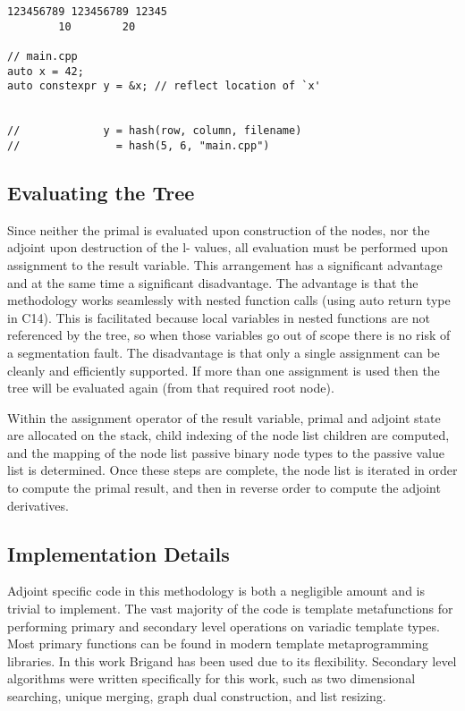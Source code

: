 \documentclass[a4paper,10pt]{article}
\def\CC{{C\nolinebreak[4]\hspace{-.05em}\raisebox{.4ex}{\tiny\bf ++}}}
\begin{document}
\begin{lstlisting}[caption={Define the compile-time address-of operator to return an effectively unique value}, label=lst:reflect]
123456789 123456789 12345
        10        20

// main.cpp
auto x = 42;
auto constexpr y = &x; // reflect location of `x'


//             y = hash(row, column, filename)
//               = hash(5, 6, "main.cpp")
\end{lstlisting}


\subsection{Evaluating the Tree}
Since neither the primal is evaluated upon construction of the nodes, nor the adjoint upon destruction of the l-
values, all evaluation must be performed upon assignment to the result variable. This arrangement has a significant
advantage and at the same time a significant disadvantage. The advantage is that the methodology works seamlessly
with nested function calls (using auto return type in {\CC}14). This is facilitated because local variables in nested
functions are not referenced by the tree, so when those variables go out of scope there is no risk of a segmentation
fault. The disadvantage is that only a single assignment can be cleanly and efficiently supported. If more than one
assignment is used then the tree will be evaluated again (from that required root node).

Within the assignment operator of the result variable, primal and adjoint state are allocated on the stack, child
indexing of the node list children are computed, and the mapping of the node list passive binary node types to the
passive value list is determined. Once these steps are complete, the node list is iterated in order to compute the primal
result, and then in reverse order to compute the adjoint derivatives.


\subsection{Implementation Details}
Adjoint specific code in this methodology is both a negligible amount and is trivial to implement. The vast majority
of the code is template metafunctions for performing primary and secondary level operations on variadic template
types. Most primary functions can be found in modern template metaprogramming libraries. In this work Brigand
\citep{Falcou2017} has been used due to its flexibility. Secondary level algorithms were written specifically for this work, such as two
dimensional searching, unique merging, graph dual construction, and list resizing.
\end{document}
